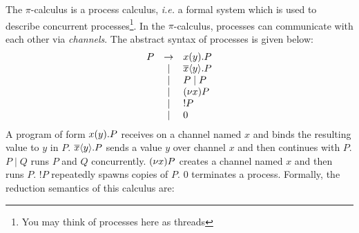 \documentclass[10pt,a4paper]{exam} %
\begin{document}
\begin{questions}
\question The $\pi$-calculus is a process calculus, \emph{i.e.} a formal system which is used to describe concurrent processes\footnote{You may think of processes here as threads}. In the $\pi$-calculus, processes can communicate with each other via \emph{channels}. The abstract syntax of processes is given below:
\begin{displaymath}
\begin{array}{lcl}
P & \to & x(y).P\\
  & \mid & \overline{x}\langle y \rangle.P\\
  & \mid & P \mid P \\
  & \mid & (\nu x)P\\
  & \mid & !P\\
  & \mid & 0
\end{array}
\end{displaymath}
A program of form $x(y).P$ receives on a channel named $x$ and binds the resulting value to $y$ in $P$. $\overline{x}\langle y \rangle.P$ sends a value $y$ over channel $x$ and then continues with $P$. $P \mid Q$ runs $P$ and $Q$ concurrently. $(\nu x)P$ creates a channel named $x$ and then runs $P$. $!P$ repeatedly spawns copies of $P$. $0$ terminates a process. Formally, the reduction semantics of this calculus are:

\end{questions}
\end{document}
